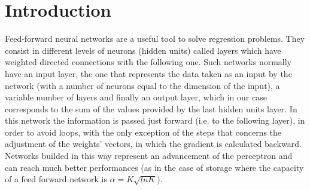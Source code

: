 \section{Introduction}
\label{sec:introduction}

Feed-forward neural networks are a useful tool to solve regression problems.
They consist in different levels of neurons (hidden units) called layers which have weighted directed connections with the following one.
Such networks normally have an input layer, the one that represents the data taken as an input by the network (with a number of neurons equal to the dimension of the input), a variable number of layers and finally an output layer, which in our case corresponds to the sum of the values provided by the last hidden units layer.
In this network the information is passed just forward (i.e. to the following layer), in order to avoid loops, with the only exception of the steps that concerns the adjustment of the weights' vectors, in which the gradient is calculated backward.
Networks builded in this way represent an advancement of the perceptron and can reach much better performances (as in the case of storage where the capacity of a feed forward network is $\alpha = K \sqrt{ln K}$).

